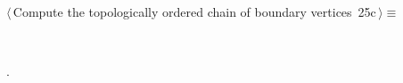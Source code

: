 \documentclass[11pt,oneside]{article}	%
\begin{document}
\begin{flushleft} \small
\begin{minipage}{\linewidth} \label{scrap63}
\protect{}$\langle\,$Compute the topologically ordered chain of boundary vertices\nobreak\ {\footnotesize 25c}$\,\rangle\equiv$
\vspace{-1ex}
\begin{list}{}{} \item
\mbox{}\verb@@\\
\mbox{}\verb@@{\NWsep}
\end{list}
\vspace{-1ex}
\footnotesize\addtolength{\baselineskip}{-1ex}
\begin{list}{}{\setlength{\itemsep}{-\parsep}\setlength{\itemindent}{-\leftmargin}}
\item {\NWtxtMacroNoRef}.
\end{list}
\end{minipage}\\[4ex]
\end{flushleft}
\end{document}
